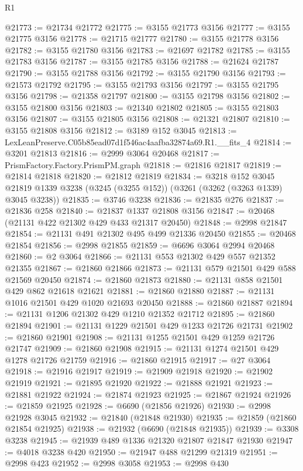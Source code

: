 \begin{lexlean}{R1}
\begin{coremodule}
@21773 := @21734 @21772
@21775 := @3155 @21773 @3156
@21777 := @3155 @21775 @3156
@21778 := @21715 @21777
@21780 := @3155 @21778 @3156
@21782 := @3155 @21780 @3156
@21783 := @21697 @21782
@21785 := @3155 @21783 @3156
@21787 := @3155 @21785 @3156
@21788 := @21624 @21787
@21790 := @3155 @21788 @3156
@21792 := @3155 @21790 @3156
@21793 := @21573 @21792
@21795 := @3155 @21793 @3156
@21797 := @3155 @21795 @3156
@21798 := @21358 @21797
@21800 := @3155 @21798 @3156
@21802 := @3155 @21800 @3156
@21803 := @21340 @21802
@21805 := @3155 @21803 @3156
@21807 := @3155 @21805 @3156
@21808 := @21321 @21807
@21810 := @3155 @21808 @3156
@21812 := @3189 @152 @3045
@21813 := LexLeanPreserve.C05b85ead07d1f546ac4aafba32874a69.R1.__fits_4
@21814 := @3201 @21813
@21816 := @2999 @3064 @20468
@21817 := PrismFactory.Factory.PrismPM.graph
@21818 := @21816 @21817
@21819 := @21814 @21818
@21820 := @21812 @21819
@21834 := @3218
    @152
    @3045
    @21819
    @1339
    @3238
    (@3245 (@3255 @152))
    (@3261 (@3262 (@3263 @1339) @3045 @3238))
@21835 := @3746 @3238
@21836 := @21835 @276
@21837 := @21836 @258
@21840 := @21837 @1337 @21808 @3156
@21847 := @20468 (@21131 @422 @21302 @429 @433 @21317 @20450)
@21848 := @2998 @21847
@21854 := @21131 @491 @21302 @495 @499 @21336 @20450
@21855 := @20468 @21854
@21856 := @2998 @21855
@21859 := @6696 @3064 @2994 @20468
@21860 := @2 @3064
@21866 := @21131 @553 @21302 @429 @557 @21352 @21355
@21867 := @21860 @21866
@21873 := @21131 @579 @21501 @429 @588 @21569 @20450
@21874 := @21860 @21873
@21880 := @21131 @858 @21501 @429 @862 @21618 @21621
@21881 := @21860 @21880
@21887 := @21131 @1016 @21501 @429 @1020 @21693 @20450
@21888 := @21860 @21887
@21894 := @21131 @1206 @21302 @429 @1210 @21352 @21712
@21895 := @21860 @21894
@21901 := @21131 @1229 @21501 @429 @1233 @21726 @21731
@21902 := @21860 @21901
@21908 := @21131 @1255 @21501 @429 @1259 @21726 @21747
@21909 := @21860 @21908
@21915 := @21131 @1274 @21501 @429 @1278 @21726 @21759
@21916 := @21860 @21915
@21917 := @27 @3064
@21918 := @21916 @21917
@21919 := @21909 @21918
@21920 := @21902 @21919
@21921 := @21895 @21920
@21922 := @21888 @21921
@21923 := @21881 @21922
@21924 := @21874 @21923
@21925 := @21867 @21924
@21926 := @21859 @21925
@21928 := @6690 (@21856 @21926)
@21930 := @2998 @21928 @3045
@21932 := @21840 (@21848 @21930)
@21935 := @21859 (@21860 @21854 @21925)
@21938 := @21932 (@6690 (@21848 @21935))
@21939 := @3308 @3238
@21945 := @21939 @489 @1336 @21320 @21807 @21847 @21930
@21947 := @4018 @3238 @420
@21950 := @21947 @488 @21299 @21319
@21951 := @2998 @423
@21952 := @2998 @3058
@21953 := @2998 @430

\end{coremodule}
\end{lexlean}
